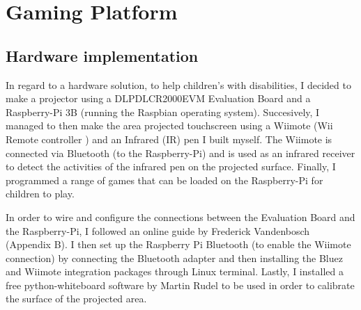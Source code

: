 \chapter{Gaming Platform}
\label{ch:progress}

 
 

\section{Hardware implementation}
In regard to a hardware solution, to help children's with disabilities, I decided to make a projector using a DLPDLCR2000EVM Evaluation Board and a Raspberry-Pi 3B (running the Raspbian operating system). Succesively, I managed to then make the area projected touchscreen using a Wiimote (Wii Remote controller \cite{wii}) and an Infrared (IR) pen I built myself. The Wiimote is connected via Bluetooth (to the Raspberry-Pi) and is used as an infrared receiver to detect the activities of the infrared pen on the projected surface. Finally, I programmed a range of games that can be loaded on the Raspberry-Pi for children to play. 

In order to wire and configure the connections between the Evaluation Board and the Raspberry-Pi, I followed an online guide by Frederick Vandenbosch \cite{projector} (Appendix B). I then set up the Raspberry Pi Bluetooth (to enable the Wiimote connection) by connecting the Bluetooth adapter and then installing the Bluez and Wiimote integration packages through Linux terminal. Lastly, I installed a free python-whiteboard software by Martin Rudel \cite{whiteboard} to be used in order to calibrate the surface of the projected area. 

